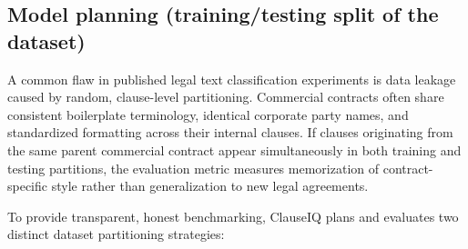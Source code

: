 \subsection{Model planning (training/testing split of the dataset)}
\label{subsec:model_planning}

A common flaw in published legal text classification experiments is data leakage caused by random, clause-level partitioning. Commercial contracts often share consistent boilerplate terminology, identical corporate party names, and standardized formatting across their internal clauses. If clauses originating from the same parent commercial contract appear simultaneously in both training and testing partitions, the evaluation metric measures memorization of contract-specific style rather than generalization to new legal agreements.

To provide transparent, honest benchmarking, ClauseIQ plans and evaluates two distinct dataset partitioning strategies:

